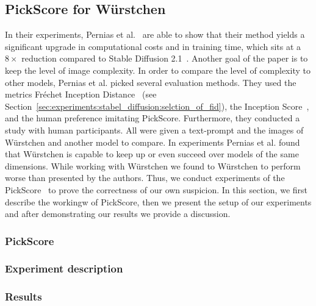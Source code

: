 \subsection{PickScore for W\"urstchen}
In their experiments, Pernias et al.~\cite{pernias2024wrstchen} are able to show
that their method yields a significant upgrade in computational costs and in
training time, which sits at a $8\times$ reduction compared to Stable Diffusion
2.1~\cite{rombach2023sd_2_1}. Another goal of the paper is to keep the level of
image complexity. In order to compare the level of complexity to other models,
Pernias et al. picked several evaluation methods. They used the metrics
Fr\'echet Inception Distance~\cite{heusel2018ganstrainedtimescaleupdate} (see
Section~\ref{sec:experiments:stabel_diffusion:selction_of_fid}), the Inception
Score~\cite{NIPS2016_8a3363ab}, and the human preference imitating
PickScore. Furthermore, they conducted a study with human participants. All were
given a text-prompt and the images of W\"urstchen and another model to compare.
In experiments Pernias et al. found that W\"urstchen is capable to keep up or
even succeed over models of the same dimensions. While working with W\"urstchen
we found to W\"urstchen to perform worse than presented by the authors. Thus, we
conduct experiments of the PickScore~\cite{DBLP:journals/corr/abs-2305-01569} to
prove the correctness of our own suspicion. In this section, we first describe
the workingw of PickScore, then we present the setup of our experiments and
after demonstrating our results we provide a discussion.

\subsubsection{PickScore}
%
\subsubsection{Experiment description}
\subsubsection{Results}